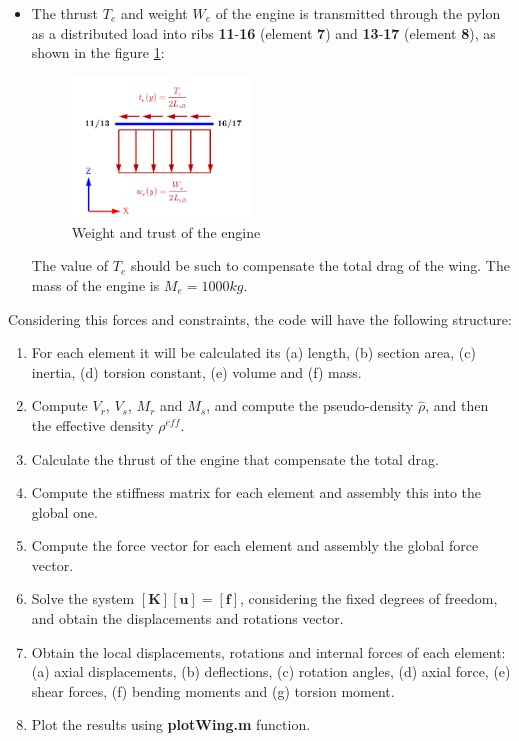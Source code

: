 \begin{itemize}
	\item The thrust $T_e$ and weight $W_e$ of the engine is transmitted
	through the pylon as a distributed load into ribs \textbf{11}-\textbf{16}
	(element \textbf{7}) and \textbf{13}-\textbf{17} (element \textbf{8}), as
	shown in the figure \ref{fig:engine}:
	\begin{figure}[h]
		\centering
		\includegraphics[width=0.45\textwidth]{img/engine.png}
		\caption{Weight and trust of the engine}
		\label{fig:engine}
	\end{figure}
	The value of $T_e$ should be such to compensate the total drag of the wing.
	The mass of the engine is $M_e = 1000 kg$.

\end{itemize}

Considering this forces and constraints, the code will have the following structure:
\begin{enumerate}
	\item For each element it will be calculated its (a) length, (b) section area,
	(c) inertia, (d) torsion constant, (e) volume and (f) mass.

	\item Compute $V_r$, $V_s$, $M_r$ and $M_s$, and compute the pseudo-density
	$\hat{\rho}$, and then the effective density $\rho^{eff}$.

	\item Calculate the thrust of the engine that compensate the total drag.

	\item Compute the stiffness matrix for each element and assembly this into
	the global one.

	\item Compute the force vector for each element and assembly the global
	force vector.

	\item Solve the system $[\mathbf{K}][\mathbf{u}] = [\mathbf{f}]$, considering
	the fixed degrees of freedom, and obtain the displacements and rotations vector.

	\item Obtain the local displacements, rotations and internal forces of each
	element: (a) axial displacements, (b) deflections, (c) rotation angles,
	(d) axial force, (e) shear forces, (f) bending moments and (g) torsion moment.

	\item Plot the results using \textbf{plotWing.m} function.
\end{enumerate}

